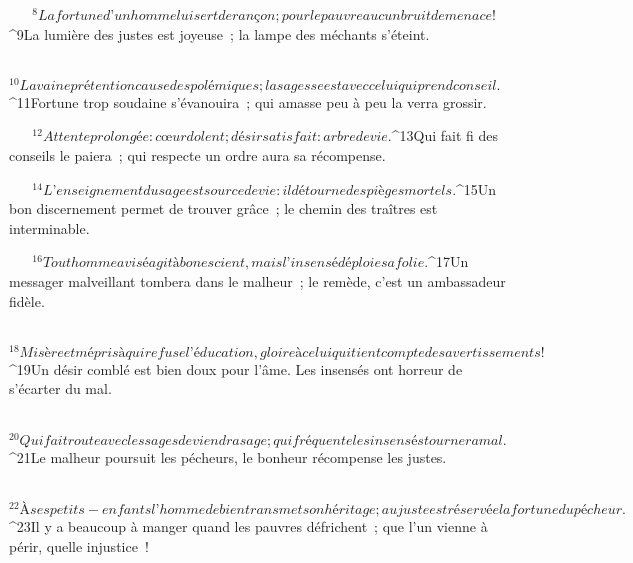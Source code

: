            
         
${}^{8}La fortune d’un homme lui sert de rançon ;
        pour le pauvre aucun bruit de menace !
        
           
         
${}^{9}La lumière des justes est joyeuse ;
        la lampe des méchants s’éteint.
        
           
         
${}^{10}La vaine prétention cause des polémiques ;
        la sagesse est avec celui qui prend conseil.
        
           
         
${}^{11}Fortune trop soudaine s’évanouira ;
        qui amasse peu à peu la verra grossir.
        
           
         
${}^{12}Attente prolongée : cœur dolent ;
        désir satisfait : arbre de vie.
        
           
         
${}^{13}Qui fait fi des conseils le paiera ;
        qui respecte un ordre aura sa récompense.
        
           
         
${}^{14}L’enseignement du sage est source de vie :
        il détourne des pièges mortels.
        
           
         
${}^{15}Un bon discernement permet de trouver grâce ;
        le chemin des traîtres est interminable.
        
           
         
${}^{16}Tout homme avisé agit à bon escient,
        mais l’insensé déploie sa folie.
        
           
         
${}^{17}Un messager malveillant tombera dans le malheur ;
        le remède, c’est un ambassadeur fidèle.
        
           
         
${}^{18}Misère et mépris à qui refuse l’éducation,
        gloire à celui qui tient compte des avertissements !
        
           
         
${}^{19}Un désir comblé est bien doux pour l’âme.
        Les insensés ont horreur de s’écarter du mal.
        
           
         
${}^{20}Qui fait route avec les sages deviendra sage ;
        qui fréquente les insensés tournera mal.
        
           
         
${}^{21}Le malheur poursuit les pécheurs,
        le bonheur récompense les justes.
        
           
         
${}^{22}À ses petits-enfants l’homme de bien transmet son héritage ;
        au juste est réservée la fortune du pécheur.
        
           
         
${}^{23}Il y a beaucoup à manger quand les pauvres défrichent ;
        que l’un vienne à périr, quelle injustice !
        
